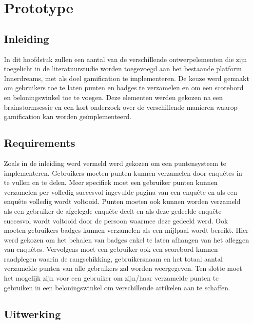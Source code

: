 
\chapter{Prototype}
\label{ch:prototype}

\section{Inleiding}

In dit hoofdstuk zullen een aantal van de verschillende ontwerpelementen die zijn toegelicht in de literatuurstudie worden toegevoegd aan het bestaande platform Innerdreams, met als doel gamification te implementeren. De keuze werd gemaakt om gebruikers toe te laten punten en badges te verzamelen en om een scorebord en beloningswinkel toe te voegen. Deze elementen werden gekozen na een brainstormsessie en een kort onderzoek over de verschillende manieren waarop gamification kan worden geïmplementeerd.

\section{Requirements}

Zoals in de inleiding werd vermeld werd gekozen om een puntensysteem te implementeren.  Gebruikers moeten punten kunnen verzamelen door enquêtes in te vullen en te delen. Meer specifiek moet een gebruiker punten kunnen verzamelen per volledig succesvol ingevulde pagina van een enquête en als een enquête volledig wordt voltooid. Punten moeten ook kunnen worden verzameld als een gebruiker de afgelegde enquête deelt en als deze gedeelde enquête succesvol wordt voltooid door de persoon waarmee deze gedeeld werd. Ook moeten gebruikers badges kunnen verzamelen als een mijlpaal wordt bereikt. Hier werd gekozen om het behalen van badges enkel te laten afhangen van het afleggen van enquêtes. Vervolgens moet een gebruiker ook een scorebord kunnen raadplegen waarin de rangschikking, gebruikersnaam en het totaal aantal verzamelde punten van alle gebruikers zal worden weergegeven. Ten slotte moet het mogelijk zijn voor een gebruiker om zijn/haar verzamelde punten te gebruiken in een beloningswinkel om verschillende artikelen aan te schaffen.

\section{Uitwerking}

